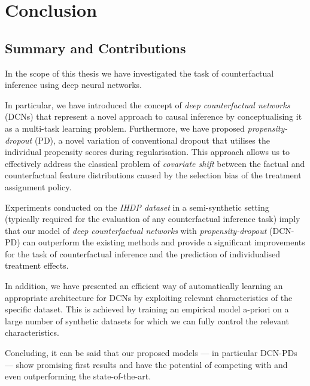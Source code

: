 %

\chapter{\label{ch:6-conclusion}Conclusion} 

\section{Summary and Contributions}
In the scope of this thesis we have investigated the task of counterfactual inference using deep neural networks. 

In particular, we have introduced the concept of \emph{deep counterfactual networks} (DCNs) that represent a novel approach to causal inference by conceptualising it as a multi-task learning problem. Furthermore, we have proposed \emph{propensity-dropout} (PD), a novel variation of conventional dropout that utilises the individual propensity scores during regularisation. This approach allows us to effectively address the classical problem of \emph{covariate shift} between the factual and counterfactual feature distributions caused by the selection bias of the treatment assignment policy. 

Experiments conducted on the \emph{IHDP dataset} in a semi-synthetic setting (typically required for the evaluation of any counterfactual inference task) imply that our model of \emph{deep counterfactual networks} with \emph{propensity-dropout} (DCN-PD) can outperform the existing methods and provide a significant improvements for the task of counterfactual inference and the prediction of individualised treatment effects. 


In addition, we have presented an efficient way of automatically learning an appropriate architecture for DCNs by exploiting relevant characteristics of the specific dataset. This is achieved by training an empirical model a-priori on a large number of synthetic datasets for which we can fully control the relevant characteristics.

Concluding, it can be said that our proposed models --- in particular DCN-PDs --- show promising first results and have the potential of competing with and even outperforming the state-of-the-art. %

